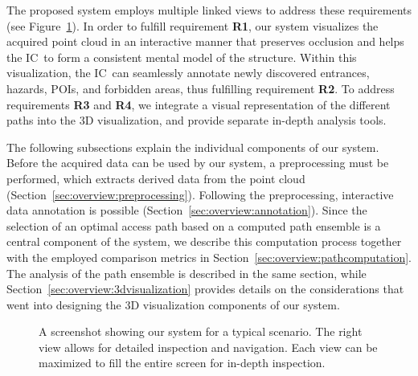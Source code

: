 \documentclass[conference,10pt,letter]{IEEEtran}
\def\IC{IC}
\begin{document}
The proposed system employs multiple linked views to address these requirements (see Figure~\ref{sec:overview:system}). In order to fulfill requirement {\bfseries R1}, our system visualizes the acquired point cloud in an interactive manner that preserves occlusion and helps the \IC\ to form a consistent mental model of the structure. Within this visualization, the \IC\ can seamlessly annotate newly discovered entrances, hazards, POIs, and forbidden areas, thus fulfilling requirement {\bfseries R2}. To address requirements {\bfseries R3} and {\bfseries R4}, we integrate a visual representation of the different paths into the 3D visualization, and provide separate in-depth analysis tools.

The following subsections explain the individual components of our system. Before the acquired data can be used by our system, a preprocessing must be performed, which extracts derived data from the point cloud (Section~\ref{sec:overview:preprocessing}). Following the preprocessing, interactive data annotation is possible (Section~\ref{sec:overview:annotation}). Since the selection of an optimal access path based on a computed path ensemble is a central component of the system, we describe this computation process together with the employed comparison metrics in Section~\ref{sec:overview:pathcomputation}. The analysis of the path ensemble is described in the same section, while Section~\ref{sec:overview:3dvisualization} provides details on the considerations that went into designing the 3D visualization components of our system.

\begin{figure}
    \centering
    \caption{A screenshot showing our system for a typical scenario. The right view allows for detailed inspection and navigation. Each view can be maximized to fill the entire screen for in-depth inspection.}
    \label{sec:overview:system}
\end{figure}
\end{document}
